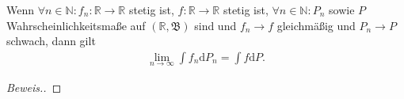 \begin{lemma}
    Wenn $\forall n\in\mathbb{N}:f_n:\mathbb{R}\to\mathbb{R}$ stetig ist, $f:\mathbb{R}\to\mathbb{R}$ stetig ist, $\forall n\in\mathbb{N}:P_n$ sowie $P$ Wahrscheinlichkeitsmaße auf $(\mathbb{R},\mathfrak{B})$ sind und $f_n\to f$ gleichmäßig und $P_n\to P$ schwach, dann gilt
    \begin{align*}
        \lim_{n\to\infty}\int f_n\mathrm{d}P_n=\int f\mathrm{d}P.
    \end{align*}
\end{lemma}
\begin{proof}[Beweis.]
    
\end{proof}